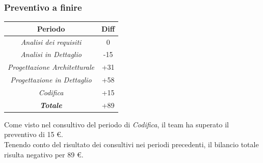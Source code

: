 \begin{frame}
	\frametitle{Preventivo a finire}
	
	\begin{center}
		\centering
		\begin{tabular}{|c|c|}
			\hline
			\textbf{Periodo} & \textbf{Diff} \\
			\hline
			\emph{Analisi dei requisiti}  & 0 \\
			\hline  \emph{Analisi in Dettaglio}  & -15 \\
			\hline  \emph{Progettazione Architetturale}  & +31 \\
			\hline  \emph{Progettazione in Dettaglio}  & +58 \\
			\hline  \emph{Codifica}  & +15 \\
			\hline  \emph{\textbf{Totale}}  & +89 \\
			\hline
		\end{tabular}
	\end{center}
	
	
Come visto nel consultivo del periodo di \textit{Codifica}, il team ha superato il preventivo di 15 \euro.\\
Tenendo conto del risultato dei consultivi nei periodi precedenti, il bilancio totale risulta negativo per 89 \euro.\\

\end{frame}

